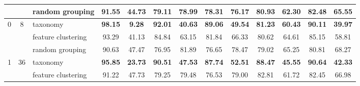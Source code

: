 \documentclass[final]{cvpr}
\begin{document}
\begin{table*}[t]
{\begin{tabular}{c|c|l|cc|cc|cc|cc|cc}
                                &                                                                                        & random grouping                                                                                             & 91.55                & 44.73                 & 79.11                & 78.99                 & 78.31                & 76.17                 & 80.93                & 62.30                 & 82.48                & 65.55                \\ \midrule
\multirow{3}{*}{0}              & \multirow{3}{*}{8}                                                                     & taxonomy                                                                                                    & \textbf{98.15}       & \textbf{9.28}         & \textbf{92.01}       & \textbf{40.63}        & \textbf{89.06}       & \textbf{49.54}        & \textbf{81.23}       & \textbf{60.43}        & \textbf{90.11}       & \textbf{39.97}       \\
                                &                                                                                        & feature clustering                                                                                          & 93.29                & 41.13                 & 84.84                & 63.15                 & 81.84                & 66.33                 & 80.62                & 64.61                 & 85.15                & 58.81                \\
                                &                                                                                        & random grouping                                                                                             & 90.63                & 47.47                 & 76.95                & 81.89                 & 76.65                & 78.47                 & 79.02                & 65.25                 & 80.81                & 68.27                \\ \midrule
\multirow{3}{*}{1}              & \multirow{3}{*}{36}                                                                    & taxonomy                                                                                                    & \textbf{95.85}       & \textbf{23.73}        & \textbf{90.51}       & \textbf{47.53}        & \textbf{87.74}       & \textbf{52.51}        & \textbf{88.47}       & \textbf{45.55}        & \textbf{90.64}       & \textbf{42.33}       \\
                                &                                                                                        & feature clustering                                                                                          & 91.22                & 47.73                 & 79.25                & 79.48                 & 76.53                & 79.00                 & 82.81                & 61.72                 & 82.45                & 66.98                \\

\end{tabular}}
\end{table*}
\end{document}
